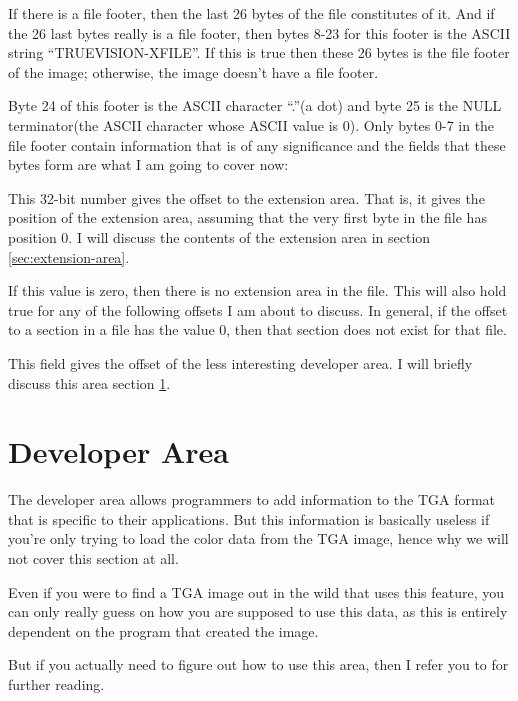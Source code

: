 If there is a file footer, then the last 26 bytes of the file
constitutes of it. And if the 26 last bytes really is a file footer,
then bytes 8-23 for this footer is the ASCII string
``TRUEVISION-XFILE''. If this is true then these 26 bytes is the file
footer of the image; otherwise, the image doesn't have a file footer.

Byte 24 of this footer is the ASCII character ``.''(a dot) and byte 25
is the NULL terminator(the ASCII character whose ASCII value is
0). Only bytes 0-7 in the file footer contain information that is of
any significance and the fields that these bytes form are what I am
going to cover now:


This 32-bit number gives the offset to the extension area. That is, it
gives the position of the extension area, assuming that the very first
byte in the file has position 0. I will discuss the contents of the
extension area in section \ref{sec:extension-area}.

If this value is zero, then there is no extension area in the
file. This will also hold true for any of the following offsets I am
about to discuss. In general, if the offset to a section in a file has
the value $0$, then that section does not exist for that file.


This field gives the offset of the less interesting developer area. I
will briefly discuss this area section \ref{sec:developer-area}.

\section{Developer Area}
\label{sec:developer-area}

The developer area allows programmers to add information to the TGA
format that is specific to their applications. But this information is
basically useless if you're only trying to load the color data from
the TGA image, hence why we will not cover this section at all.

Even if you were to find a TGA image out in the wild that uses this
feature, you can only really guess on how you are supposed to use this
data, as this is entirely dependent on the program that created the
image.

But if you actually need to figure out how to use this area, then I
refer you to
\cite{murray1996encyclopedia,91:_truev_tga_file_format_specif} for
further reading.

